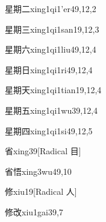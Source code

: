 \begin{verbete}{星期二}{xing1qi1'er4}{9,12,2}
\end{verbete}

\begin{verbete}{星期三}{xing1qi1san1}{9,12,3}
\end{verbete}

\begin{verbete}{星期六}{xing1qi1liu4}{9,12,4}
\end{verbete}

\begin{verbete}{星期日}{xing1qi1ri4}{9,12,4}
\end{verbete}

\begin{verbete}{星期天}{xing1qi1tian1}{9,12,4}
\end{verbete}

\begin{verbete}{星期五}{xing1qi1wu3}{9,12,4}
\end{verbete}

\begin{verbete}{星期四}{xing1qi1si4}{9,12,5}
\end{verbete}

\begin{verbete}{省}{xing3}{9}[Radical 目]
\end{verbete}

\begin{verbete}{省悟}{xing3wu4}{9,10}
\end{verbete}

\begin{verbete}{修}{xiu1}{9}[Radical 人]
\end{verbete}

\begin{verbete}{修改}{xiu1gai3}{9,7}
\end{verbete}

